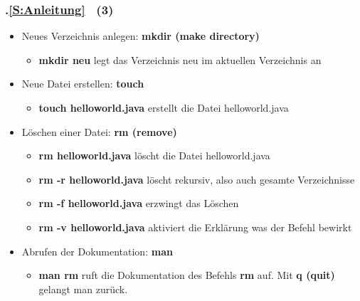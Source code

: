 \begin{frame}[t]%
\frametitle{\kap.\ref{S:Anleitung} \stitle\ (3)}%

\begin{itemize}
  \setlength{\itemsep}{4pt}
  \item Neues Verzeichnis anlegen: \textbf{mkdir (make directory)}
  \begin{itemize}
    \item \textbf{mkdir neu} legt das Verzeichnis neu im aktuellen Verzeichnis an
  \end{itemize}
  \item Neue Datei erstellen: \textbf{touch}
  \begin{itemize}
    \item \textbf{touch helloworld.java} erstellt die Datei helloworld.java
  \end{itemize}
  \item L\"oschen einer Datei: \textbf{rm (remove)}
  \begin{itemize}
    \setlength{\itemsep}{2pt}
    \item \textbf{rm helloworld.java} l\"oscht die Datei helloworld.java
    \item \textbf{rm -r helloworld.java} l\"oscht rekursiv, also auch gesamte Verzeichnisse
    \item \textbf{rm -f helloworld.java} erzwingt das L\"oschen
    \item \textbf{rm -v helloworld.java} aktiviert die Erkl\"arung was der Befehl bewirkt
  \end{itemize}
  \item Abrufen der Dokumentation: \textbf{man}
  \begin{itemize}
    \item \textbf{man rm} ruft die Dokumentation des Befehls \textbf{rm} auf. Mit \textbf{q (quit)} gelangt man zur\"uck.
  \end{itemize}
\end{itemize}

\end{frame}


